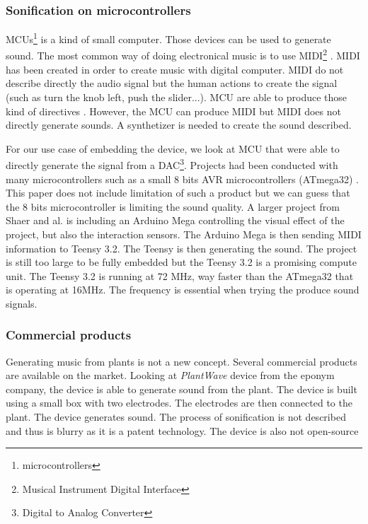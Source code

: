 \subsubsection{Sonification on microcontrollers}

MCUs\footnote{microcontrollers} \cite{rochim2019design} is a kind of small computer.
Those devices can be used to generate sound. The most common way of doing electronical music
is to use MIDI\footnote{Musical Instrument Digital Interface} \cite{loyMusiciansMakeStandard1985}.
MIDI has been created in order to create music with digital computer. MIDI do not describe directly 
the audio signal but the human actions to create the signal (such as turn the knob left, push the slider...).
MCU are able to produce those kind of directives \cite{fazendaProceedingsInternationalConference1}\cite{fazendaProceedingsInternationalConference2}.
However, the MCU can produce MIDI but MIDI does not directly generate sounds. A synthetizer is needed to create the sound
described.

For our use case of embedding the device, we look at MCU that were able to directly generate the signal 
from a DAC\footnote{Digital to Analog Converter}. Projects had been conducted with many microcontrollers such as a small
8 bits AVR microcontrollers (ATmega32) \cite{hussainAVRMicrocontrollerImplementation2011}. This paper does not include limitation of
such a product but we can guess that the 8 bits microcontroller is limiting the sound quality. A larger project from Shaer and al.
\cite{shaerInteractiveCapacitiveTouch2020} is including an Arduino Mega controlling the visual effect of the project,
but also the interaction sensors. The Arduino Mega is then sending MIDI information to Teensy 3.2. The Teensy is then 
generating the sound. The project is still too large to be fully embedded but the Teensy 3.2 is a promising compute unit.
The Teensy 3.2 is running at 72 MHz, way faster than the ATmega32 that is operating at 16MHz. The frequency is essential
when trying the produce sound signals.


\subsubsection{Commercial products}

Generating music from plants is not a new concept. Several commercial products are available on the market.
Looking at \textit{PlantWave} device from the eponym company, the device is able to generate sound from the plant. The device is
built using a small box with two electrodes. The electrodes are then connected to the plant. The device generates sound.
The process of sonification is not described and thus is blurry as it is a patent technology. The device is also not open-source

